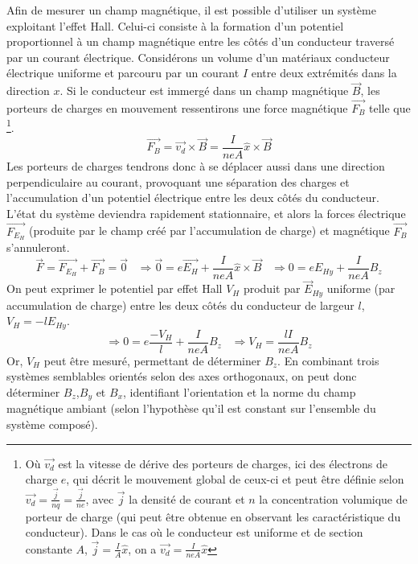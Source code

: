 \documentclass{standalone}
\author{Bastien Gauthier-Soumis,\\
 Edward Halle-Hannan, ,\\
Massine Kadi, ,\\
Félix Pelletier, }
\begin{document}
Afin de mesurer un champ magnétique, il est possible d'utiliser un système exploitant l'effet Hall. Celui-ci consiste à la formation d'un potentiel proportionnel à un champ magnétique entre les côtés d'un conducteur traversé par un courant électrique.
Considérons un volume d'un matériaux conducteur électrique uniforme et parcouru par un courant $I$ entre deux extrémités dans la direction $x$. Si le conducteur est immergé dans un champ magnétique $\vec{B}$, les porteurs de charges en mouvement ressentirons une force magnétique $\vec{F_B}$ telle que \footnote{Où $\vec{v_d}$ est la vitesse de dérive des porteurs de charges, ici des électrons de charge $e$, qui décrit le mouvement global de ceux-ci et peut être définie selon $\vec{v_d} = \frac{\vec{j}}{nq}=\frac{\vec{j}}{ne}$, avec $\vec{j}$ la densité de courant et $n$ la concentration volumique de porteur de charge (qui peut être obtenue en observant les caractéristique du conducteur). Dans le cas où le conducteur est uniforme et de section constante $A$, $\vec{j}=\frac{I}{A}\hat{x}$, on a $\vec{v_d} = \frac{I}{neA}\hat{x}$}.
\begin{equation*}
\vec{F_B} = \vec{v_d}\times \vec{B}= \frac{I}{neA}\hat{x}\times \vec{B}
\end{equation*}
Les porteurs de charges tendrons donc à se déplacer aussi dans une direction perpendiculaire au courant, provoquant une séparation des charges et l'accumulation d'un potentiel électrique entre les deux côtés du conducteur. L'état du système deviendra rapidement stationnaire, et alors la forces électrique $\vec{F_{E_H}}$ (produite par le champ créé par l'accumulation de charge) et magnétique $\vec{F_B}$ s'annuleront.
\begin{equation*}
\vec{F}=\vec{F_{E_H}}+\vec{F_B}=\vec{0} \;\;\;\Rightarrow \vec{0}=e\vec{E_H}+\frac{I}{neA}\hat{x}\times \vec{B} \;\;\;\Rightarrow 0=eE_{Hy}+\frac{I}{neA}B_z
\end{equation*}
On peut exprimer le potentiel  par effet Hall $V_H$ produit par $\vec{E}_{Hy}$ uniforme (par accumulation de charge) entre les deux côtés du conducteur de largeur $l$, $V_H = -lE_{Hy}$.
\begin{equation*}
\Rightarrow 0=e\frac{-V_H}{l}+\frac{I}{neA}B_z \;\;\;\Rightarrow V_H = \frac{lI}{neA}B_z
\end{equation*}
Or, $V_H$ peut être mesuré, permettant de déterminer $B_z$.
En combinant trois systèmes semblables orientés selon des axes orthogonaux, on peut donc déterminer $B_z$,$B_y$ et $B_x$, identifiant l'orientation et la norme du champ magnétique ambiant (selon l'hypothèse qu'il est constant sur l'ensemble du système composé). 
\end{document}
